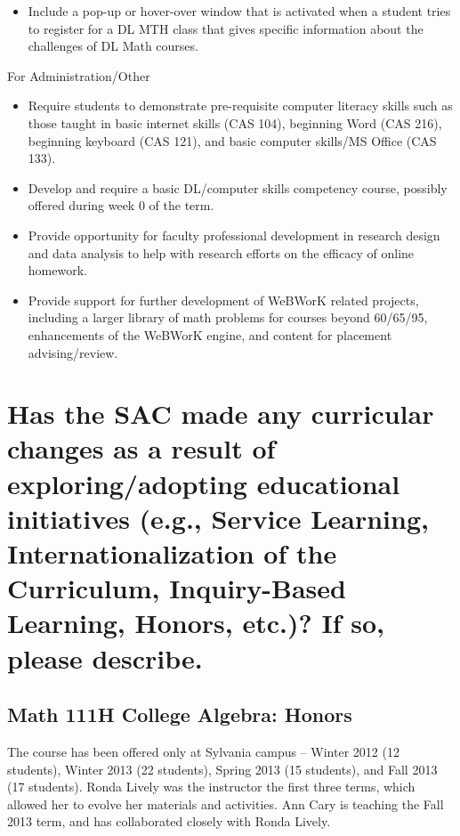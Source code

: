 \begin{description}
\begin{itemize}
\item Include a pop-up or hover-over window that is activated when a student tries to register for a DL MTH class that gives specific information about the challenges of DL Math courses.  
\end{itemize}
\item For Administration/Other
\begin{itemize}
\item Require students to demonstrate pre-requisite computer literacy skills such as those taught in basic internet skills (CAS 104), beginning Word (CAS 216), beginning keyboard (CAS 121), and basic computer skills/MS Office (CAS 133).
\item Develop and require a basic DL/computer skills competency course, possibly offered during week 0 of the term.  
\item Provide opportunity for faculty professional development in research design and data analysis to help with research efforts on the efficacy of online homework.
\item Provide support for further development of WeBWorK related projects, including a larger library of math problems for courses beyond 60/65/95, enhancements of the WeBWorK engine, and content for placement advising/review.
\end{itemize}
\end{description}

\section[Curricular changes resulting from educational initiatives]{Has the SAC made any curricular changes as a result of exploring/adopting educational initiatives (e.g., Service Learning, Internationalization of the Curriculum, Inquiry-Based Learning, Honors, etc.)?  If so, please describe.}


\subsection{Math 111H College Algebra: Honors}

The course has been offered only at Sylvania campus -- Winter 2012 (12 students), Winter 2013 (22 students), Spring 2013 (15 students), and Fall 2013 (17 students).  Ronda Lively was the instructor the first three terms, which allowed her to evolve her materials and activities.  Ann Cary is teaching the Fall 2013 term, and has collaborated closely with Ronda Lively. 


